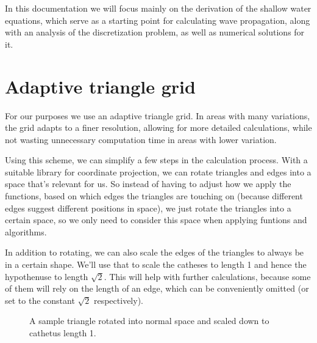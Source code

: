 \documentclass{article}
\begin{document}
In this documentation we will focus mainly on the derivation of the shallow water equations, which serve as a starting point for calculating wave propagation, along with an analysis of the discretization problem, as well as numerical solutions for it.

\section{Adaptive triangle grid}
\label{sec:triangles}

For our purposes we use an adaptive triangle grid. In areas with many variations, the grid adapts to a finer resolution, allowing for more detailed calculations, while not wasting unnecessary computation time in areas with lower variation.

Using this scheme, we can simplify a few steps in the calculation process. With a suitable library for coordinate projection, we can rotate triangles and edges into a space that's relevant for us. So instead of having to adjust how we apply the functions, based on which edges the triangles are touching on (because different edges suggest different positions in space), we just rotate the triangles into a certain space, so we only need to consider this space when applying funtions and algorithms.

In addition to rotating, we can also scale the edges of the triangles to always be in a certain shape. We'll use that to scale the catheses to length 1 and hence the hypothenuse to length $\sqrt{2}$. This will help with further calculations, because some of them will rely on the length of an edge, which can be conveniently omitted (or set to the constant $\sqrt{2}$ respectively).

\begin{figure}[h]
  \centering
  \caption{A sample triangle rotated into normal space and scaled down to cathetus length 1.}
  \label{fig:triangle-projection}
\end{figure}
\end{document}
